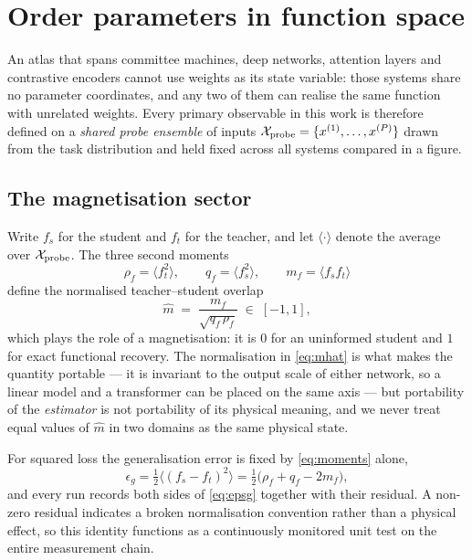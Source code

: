 \section{Order parameters in function space}
\label{sec:observables}

An atlas that spans committee machines, deep networks, attention layers and
contrastive encoders cannot use weights as its state variable: those systems
share no parameter coordinates, and any two of them can realise the same
function with unrelated weights. Every primary observable in this work is
therefore defined on a \emph{shared probe ensemble} of inputs
$\mathcal X_{\rm probe}=\{x^{(1)},\dots,x^{(P)}\}$ drawn from the task
distribution and held fixed across all systems compared in a figure.

\subsection{The magnetisation sector}

Write $f_s$ for the student and $f_t$ for the teacher, and let
$\langle\cdot\rangle$ denote the average over $\mathcal X_{\rm probe}$. The
three second moments
\begin{equation}
  \rho_f=\langle f_t^2\rangle,\qquad
  q_f=\langle f_s^2\rangle,\qquad
  m_f=\langle f_s f_t\rangle
  \label{eq:moments}
\end{equation}
define the normalised teacher--student overlap
\begin{equation}
  \hat m \;=\; \frac{m_f}{\sqrt{q_f\,\rho_f}}\;\in\;[-1,1],
  \label{eq:mhat}
\end{equation}
which plays the role of a magnetisation: it is $0$ for an uninformed student
and $1$ for exact functional recovery. The normalisation in \eqref{eq:mhat} is
what makes the quantity portable --- it is invariant to the output scale of
either network, so a linear model and a transformer can be placed on the same
axis --- but portability of the \emph{estimator} is not portability of its
physical meaning, and we never treat equal values of $\hat m$ in two domains as
the same physical state.

For squared loss the generalisation error is fixed by
\eqref{eq:moments} alone,
\begin{equation}
  \epsilon_g=\tfrac12\big\langle (f_s-f_t)^2\big\rangle
  =\tfrac12\big(\rho_f+q_f-2m_f\big),
  \label{eq:epsg}
\end{equation}
and every run records both sides of \eqref{eq:epsg} together with their
residual. A non-zero residual indicates a broken normalisation convention
rather than a physical effect, so this identity functions as a continuously
monitored unit test on the entire measurement chain.

